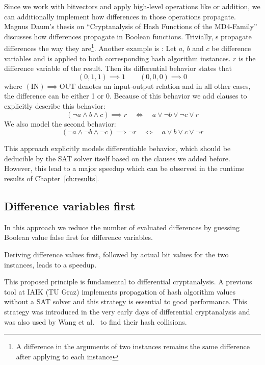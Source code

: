 Since we work with bitvectors and apply high-level operations like  or addition,
we can additionally implement how differences in those operations propagate.
Magnus Daum's thesis on \enquote{Cryptanalysis of Hash Functions of the
MD4-Family}~\cite[Table 4.4]{daum2005cryptanalysis} discusses how differences propagate in
Boolean functions. Trivially, s propagate differences the way they are\footnote{
A difference in the arguments of two  instances remains the same difference
after applying  to each instance}. Another example is :
Let $a$, $b$ and $c$ be difference variables and  is applied to both corresponding
hash algorithm instances. $r$ is the difference variable of the result.
Then its differential behavior states that
\[ (0, 1, 1) \implies 1 \qquad (0, 0, 0) \implies 0 \]
where $(\text{IN}) \implies \text{OUT}$ denotes an input-output relation
and in all other cases, the difference can be either 1 or 0.
Because of this behavior we add clauses to explicitly describe this behavior:
\[ (\neg a \land b \land c) \implies r \quad \iff \quad a \lor \neg b \lor \neg c \lor r \]
We also model the second behavior:
\[ (\neg a \land \neg b \land \neg c) \implies \neg r \quad \iff \quad a \lor b \lor c \lor \neg r \]

This approach explicitly models differentiable behavior, which should be deducible
by the SAT solver itself based on the clauses we added before.
However, this lead to a major speedup which can be observed in the runtime results
of Chapter~\ref{ch:results}.

\subsection{Difference variables first}
\label{sec:enc-diff-desc-ocnf}
%
In this approach we reduce the number of evaluated differences by guessing
Boolean value false first for difference variables.

\begin{prop}
  Deriving difference values first, followed by actual bit values for the two instances,
  leads to a speedup.
\end{prop}

This proposed principle is fundamental to differential cryptanalysis. A previous tool
at IAIK (TU Graz) implements propagation of hash algorithm values without a SAT solver
and this strategy is essential to good performance. This strategy was introduced
in the very early days of differential cryptanalysis and was also used by Wang et
al.~\cite{wang2004} to find their hash collisions.

